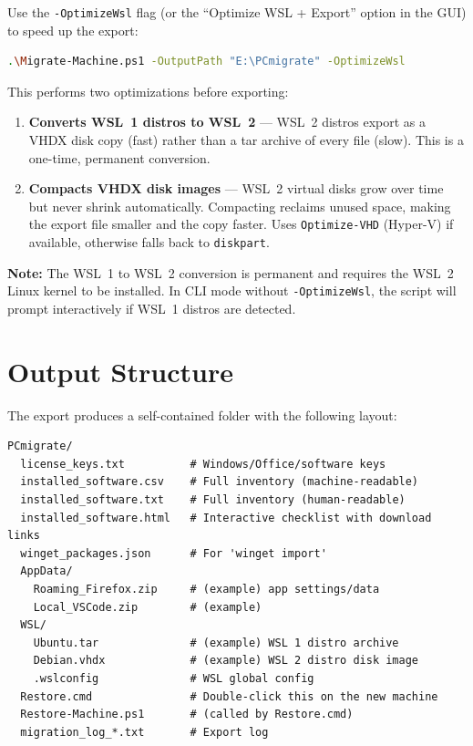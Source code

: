 \documentclass[11pt,a4paper]{article}
\begin{document}
Use the \texttt{-OptimizeWsl} flag (or the ``Optimize WSL + Export'' option in the GUI) to speed up the export:

\begin{lstlisting}[language=bash]
.\Migrate-Machine.ps1 -OutputPath "E:\PCmigrate" -OptimizeWsl
\end{lstlisting}

This performs two optimizations before exporting:

\begin{enumerate}
    \item \textbf{Converts WSL~1 distros to WSL~2} --- WSL~2 distros export as a VHDX disk copy (fast) rather than a tar archive of every file (slow). This is a one-time, permanent conversion.
    \item \textbf{Compacts VHDX disk images} --- WSL~2 virtual disks grow over time but never shrink automatically. Compacting reclaims unused space, making the export file smaller and the copy faster. Uses \texttt{Optimize-VHD} (Hyper-V) if available, otherwise falls back to \texttt{diskpart}.
\end{enumerate}

\noindent\textbf{Note:} The WSL~1 to WSL~2 conversion is permanent and requires the WSL~2 Linux kernel to be installed. In CLI mode without \texttt{-OptimizeWsl}, the script will prompt interactively if WSL~1 distros are detected.

\section{Output Structure}

The export produces a self-contained folder with the following layout:

\begin{lstlisting}
PCmigrate/
  license_keys.txt          # Windows/Office/software keys
  installed_software.csv    # Full inventory (machine-readable)
  installed_software.txt    # Full inventory (human-readable)
  installed_software.html   # Interactive checklist with download links
  winget_packages.json      # For 'winget import'
  AppData/
    Roaming_Firefox.zip     # (example) app settings/data
    Local_VSCode.zip        # (example)
  WSL/
    Ubuntu.tar              # (example) WSL 1 distro archive
    Debian.vhdx             # (example) WSL 2 distro disk image
    .wslconfig              # WSL global config
  Restore.cmd               # Double-click this on the new machine
  Restore-Machine.ps1       # (called by Restore.cmd)
  migration_log_*.txt       # Export log
\end{lstlisting}
\end{document}
